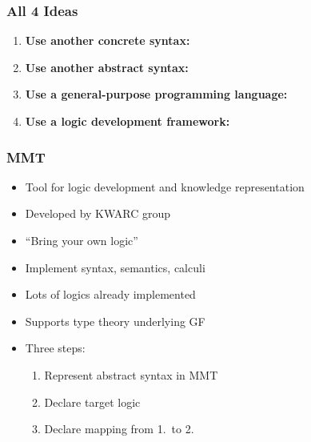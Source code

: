 \begin{frame}
    \frametitle{All 4 Ideas}
    \begin{enumerate}
        \item \textbf{Use another concrete syntax:}\par
            \gfsemconstrpic{}
        \item \textbf{Use another abstract syntax:}\par
            \def\gfsemconstrpicAST{$\text{AST}_\text{NL}$}
            \def\gfsemconstrpicArrow{\ttfamily pt -compute}
            \def\gfsemconstrpicLOG{$\text{AST}_\text{Logic}$}
            \gfsemconstrpic{}
        \pause
        \item \textbf{Use a general-purpose programming language:}\par
            \def\gfsemconstrpicAST{$\text{AST}$}
            \def\gfsemconstrpicArrow{Haskell code}
            \def\gfsemconstrpicLOG{Logical Expr.}
            \gfsemconstrpic{}
        \pause
        \item \textbf{Use a logic development framework:}\par
            \def\gfsemconstrpicAST{$\text{AST}$}
            \def\gfsemconstrpicArrow{MMT stuff}
            \def\gfsemconstrpicLOG{MMT term}
            \gfsemconstrpic{}
    \end{enumerate}
\end{frame}


\begin{frame}
    \frametitle{MMT}
    \begin{itemize}
        \item Tool for logic development and knowledge representation
        \item Developed by KWARC group
        \item ``Bring your own logic''
        \item Implement syntax, semantics, calculi
        \item Lots of logics already implemented
        \item Supports type theory underlying GF
        \item Three steps:
            \begin{enumerate}
                \item Represent abstract syntax in MMT
                \item Declare target logic
                \item Declare mapping from 1.\ to 2.
            \end{enumerate}
    \end{itemize}
\end{frame}

